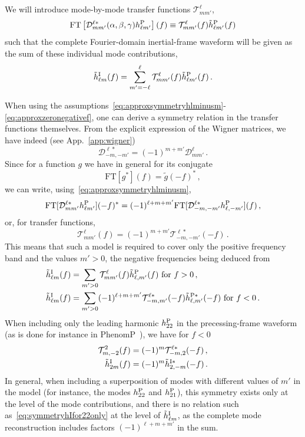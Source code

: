 \documentclass[aps,showpacs,twocolumn,
prd,superscriptaddress,nofootinbib]{revtex4-1}
\newcommand{\be}{\begin{equation}}
\newcommand{\ee}{\end{equation}}
\newcommand\calT{{\mathcal{T}}}
\newcommand\calD{{\mathcal{D}}}
\newcommand{\nn}{\nonumber}
\begin{document}
We will introduce mode-by-mode transfer functions $\calT^{\ell}_{mm'}$,
\be\label{eq:defprectransfer}
	\mathrm{FT} \left[ \calD^{\ell *}_{mm'} (\alpha,\beta,\gamma) h_{\ell m'}^{\rm P} \right] (f) \equiv \calT^{\ell}_{mm'}(f) \tilde{h}_{\ell m'}^{\rm P} (f)
\ee
such that the complete Fourier-domain inertial-frame waveform will be given as the sum of these individual mode contributions,
\be\label{eq:defprechIsum}
	\tilde{h}_{\ell m}^{\rm I} (f) = \sum\limits_{m'=-\ell}^{\ell} \calT^{\ell}_{mm'}(f) \tilde{h}_{\ell m'}^{\rm P} (f) \,.
\ee

When using the assumptions~\eqref{eq:approxsymmetryhlminusm}-\eqref{eq:approxzeronegativef}, one can derive a symmetry relation in the transfer functions themselves. From the explicit expression of the Wigner matrices, we have indeed (see App.~\ref{app:wigner})
\be
	\calD^{\ell *}_{-m,-m'} = (-1)^{m+m'}\calD^{\ell}_{mm'} \,.
\ee
Since for a function $g$ we have in general for its conjugate
\be
	\mathrm{FT}[g^{*}](f) = \tilde{g}(-f)^{*} \,,
\ee
we can write, using~\eqref{eq:approxsymmetryhlminusm},
\be
	\mathrm{FT}[\calD^{\ell *}_{mm'} h_{\ell m'}^{\rm P}](-f)^{*} = (-1)^{\ell+m+m'} \mathrm{FT}[\calD^{\ell *}_{-m,-m'} h_{\ell, -m'}^{\rm P}](f) \,,
\ee
or, for transfer functions,
\be
	\calT^{\ell}_{mm'}(f) = (-1)^{m+m'} \calT^{\ell *}_{-m,-m'}(-f) \,.
\ee
This means that such a model is required to cover only the positive frequency band and the values $m'>0$, the negative frequencies being deduced from
\begin{align}
	\tilde{h}^{\rm I}_{\ell m}(f) &= \sum_{m'>0} \calT^{\ell}_{mm'}(f) \tilde{h}^{\rm P}_{\ell, m'}(f) \text{ for } f>0 \,, \nn\\
	\tilde{h}^{\rm I}_{\ell m}(f) &= \sum_{m'>0} (-1)^{\ell+m+m'} \calT^{\ell *}_{-m,m'}(-f) \tilde{h}^{\rm P *}_{\ell, m'}(-f) \text{ for } f<0 \,.
\end{align}
When including only the leading harmonic $h^{\rm P}_{22}$ in the precessing-frame waveform (as is done for instance in PhenomP~\cite{Hannam+13}), we have for $f<0$
\begin{subequations}
\begin{align}
	\calT^{2}_{m,-2}(f) &= (-1)^{m} \calT^{\ell *}_{-m,2}(-f) \,, \\
	\tilde{h}^{\rm I}_{2 m}(f) &= (-1)^{m} \tilde{h}^{\rm I *}_{2,-m}(-f) \,. \label{eq:symmetryhIfor22only}
\end{align}
\end{subequations}
In general, when including a superposition of modes with different values of $m'$ in the model (for instance, the modes $h^{\rm P}_{22}$ and $h^{\rm P}_{21}$), this symmetry exists only at the level of the mode contributions, and there is no relation such as~\eqref{eq:symmetryhIfor22only}  at the level of $\tilde{h}^{\rm I}_{\ell m}$, as the complete mode reconstruction includes factors $(-1)^{\ell+m+m'}$ in the sum.
\end{document}
